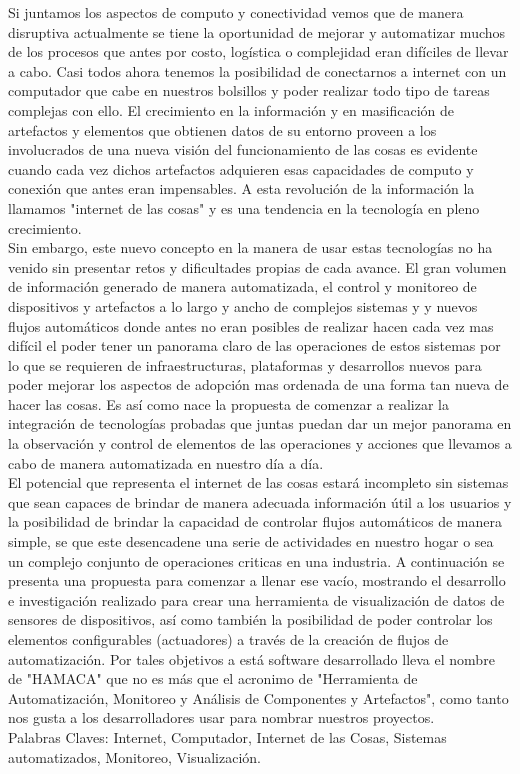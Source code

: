 Si juntamos los aspectos de computo y conectividad vemos que de manera disruptiva actualmente se tiene la oportunidad de mejorar y automatizar muchos de los procesos que antes por costo, logística o complejidad eran difíciles de llevar a cabo. Casi todos ahora tenemos la posibilidad de conectarnos a internet con un computador que cabe en nuestros bolsillos y poder realizar todo tipo de tareas complejas con ello. El crecimiento en la información y en masificación de artefactos y elementos que obtienen datos de su entorno proveen a los involucrados de una nueva visión del funcionamiento de las cosas es evidente cuando cada vez dichos artefactos adquieren esas capacidades de computo y conexión que antes eran impensables. A esta revolución de la información la llamamos "internet de las cosas" y es una tendencia en la tecnología en pleno crecimiento.\\ 

Sin embargo, este nuevo concepto en la manera de usar estas tecnologías no ha venido sin presentar retos y dificultades propias de cada avance. El gran volumen de información generado de manera automatizada, el control y monitoreo de dispositivos y artefactos a lo largo y ancho de complejos sistemas y y nuevos flujos automáticos donde antes no eran posibles de realizar hacen cada vez mas difícil el poder tener un panorama claro de las operaciones de estos sistemas por lo que se requieren de infraestructuras, plataformas y desarrollos nuevos para poder mejorar los aspectos de adopción mas ordenada de una forma tan nueva de hacer las cosas. Es así como nace la propuesta de comenzar a realizar la integración de tecnologías probadas que juntas puedan dar un mejor panorama en la observación y control de elementos de las operaciones y acciones que llevamos a cabo de manera automatizada en nuestro día a día.\\

El potencial que representa el internet de las cosas estará incompleto sin sistemas que sean capaces de brindar de manera adecuada información útil a los usuarios y la posibilidad de brindar la capacidad de controlar flujos automáticos de manera simple, se que este desencadene una serie de actividades en nuestro hogar o sea un complejo conjunto de operaciones criticas en una industria. A continuación se presenta una propuesta para comenzar a llenar ese vacío, mostrando el desarrollo e investigación realizado para crear una herramienta de visualización de datos de sensores de dispositivos, así como también la posibilidad de poder controlar los elementos configurables (actuadores) a través de la creación de flujos de automatización. Por tales objetivos a está software desarrollado lleva el nombre de "HAMACA" que no es más que el acronimo de "Herramienta de Automatización, Monitoreo y Análisis de Componentes y Artefactos", como tanto nos gusta a los desarrolladores usar para nombrar nuestros proyectos.\\
 
\vspace{\fill}
Palabras Claves: Internet, Computador, Internet de las Cosas, Sistemas automatizados, Monitoreo, Visualización.
\vspace{20px}